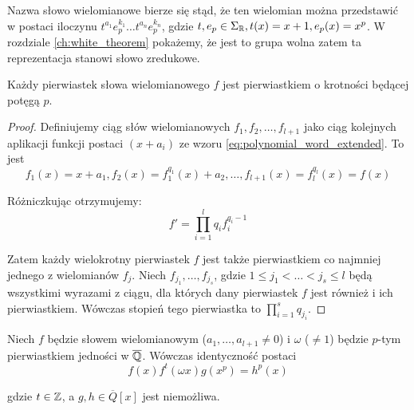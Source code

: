 Nazwa słowo wielomianowe bierze się stąd, że ten wielomian można przedstawić w
postaci iloczynu $t^{a_1}e_p^{k_1} \ldots t^{a_n}e_p^{k_n}$, gdzie $t, e_p \in
\Sigma_{\mathbb{R}}, t(x) = x + 1, e_p(x) = x^p$. W rozdziale \ref{ch:white_theorem}
pokażemy, że jest to grupa wolna zatem ta reprezentacja stanowi słowo
zredukowe.

\begin{lemma}
  Każdy pierwiastek słowa wielomianowego $f$ jest pierwiastkiem o krotności
  będącej potęgą $p$.
  \label{lem:multiplicity_lemma}
\end{lemma}

\begin{proof}
Definiujemy ciąg słów wielomianowych $f_1, f_2, \ldots, f_{l+1}$ jako ciąg
kolejnych aplikacji funkcji postaci $(x+a_i)$ ze wzoru
\ref{eq:polynomial_word_extended}.
To jest
\[f_1(x) = x + a_1, f_2(x) = f_1^{q_1}(x) + a_2, \ldots, f_{l+1}(x) =
f_l^{q_l}(x) = f(x)\]

Różniczkując otrzymujemy:
\[f' = \prod_{i=1}^l q_i f_i^{q_i - 1}\]

Zatem każdy wielokrotny pierwiastek $f$ jest także pierwiastkiem co najmniej
jednego z wielomianów $f_j$. Niech $f_{j_1}, \ldots, f_{j_s}$, gdzie $1 \leq j_1
< \ldots < j_s \leq l$ będą wszystkimi wyrazami z ciągu, dla których dany
pierwiastek $f$ jest również i ich pierwiastkiem. Wówczas stopień tego
pierwiastka to $\prod_{i=1}^s q_{j_i}$.
\end{proof}

\begin{lemma}
  Niech $f$ będzie słowem wielomianowym ($a_1, \ldots, a_{l+1} \neq 0$) i
  $\omega$ ($\neq 1$) będzie $p$-tym pierwiastkiem jedności w $\overline{\mathbb{Q}}$.
  Wówczas identyczność postaci
  \begin{equation}
    f(x)f^t(\omega x)g\left(x^p\right) = h^p(x)
    \label{eq:polynomial_lemma}
  \end{equation}

  gdzie $t \in \mathbb{Z}$, a $g, h \in \overline{Q}[x]$ jest niemożliwa.
  \label{lem:main_polynomial_lemma}
\end{lemma}

